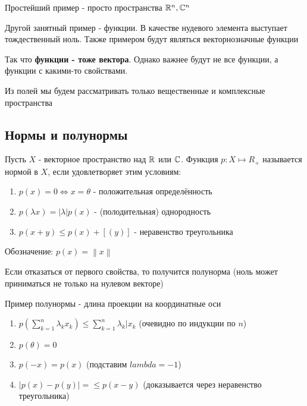 \documentclass[12pt, a4paper]{article}
\begin{document}
  \begin{example}
  Простейший пример - просто пространства ${\mathbb{R}}^n, {\mathbb{C}}^n$
  \end{example}

  \begin{example}
  Другой занятный пример - функции. В качестве нудевого элемента выступает тождественный ноль.
  Также примером будут являться векторнозначные функции
  \end{example}

  Так что \textbf{функции - тоже вектора}.
  Однако важнее будут не все функции, а функции с какими-то свойствами.

  \begin{note}
  Из полей мы будем рассматривать только вещественные и комплексные пространства
  \end{note}

  \subsection{Нормы и полунормы}

  \begin{definition}
  [Норма]
  Пусть $X$ - векторное пространство над ${\mathbb{R}}$ или ${\mathbb{C}}$. 
  Функция $p: X \mapsto R_{+}$ называется нормой в $X$, если удовлетворяет этим условиям:

    \begin{enumerate}
      \item $p(x) = 0 \Longleftrightarrow x = \theta$ - положительная определённость
      \item $p(\lambda x) = |\lambda| p(x)$ - (полодительная) однородность
      \item $p(x + y) \leqslant p(x) + [(y)]$ - неравенство треугольника
    \end{enumerate}
  \end{definition}

  Обозначение: $p(x) = \left\lVert x \right\rVert$

  \begin{note}
    Если отказаться от первого свойства, то получится полунорма 
    (ноль может приниматься не только на нулевом векторе)

    Пример полунормы - длина проекции на координатные оси
  \end{note}

  \begin{lemma}

    \begin{enumerate}
    \item $p(\sum_{k = 1}^n \lambda_k x_k) \leqslant \sum_{k = 1}^n \lambda_k| x_k$ (очевидно по индукции по $n$)
    \item $p(\theta) = 0$
    \item $p(-x) = p(x)$ (подставим $lambda = -1$)
    \item $|p(x) - p(y)| = \leqslant p(x - y)$ (доказывается через неравенство треугольника)
    \end{enumerate}
  \end{lemma}
\end{document}
